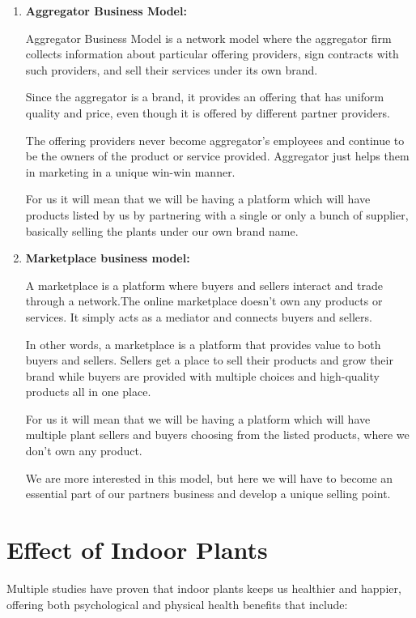 \documentclass{article}
\begin{document}
\begin{enumerate}

\item  \textbf{Aggregator Business Model:}

Aggregator Business Model is a network model where the aggregator firm collects information about particular offering providers, sign contracts with such providers, and sell their services under its own brand.

Since the aggregator is a brand, it provides an offering that has uniform quality and price, even though it is offered by different partner providers.

The offering providers never become aggregator’s employees and continue to be the owners of the product or service provided. Aggregator just helps them in marketing in a unique win-win manner.

For us it will mean that we will be having a platform which will have products listed by us by partnering with a single or only a bunch of supplier, basically selling the plants under our own brand name.


\item  \textbf{Marketplace business model:}

A marketplace is a platform where buyers and sellers interact and trade through a network.The online marketplace doesn’t own any products or services. It simply acts as a mediator and connects buyers and sellers.

In other words, a marketplace is a platform that provides value to both buyers and sellers. Sellers get a place to sell their products and grow their brand while buyers are provided with multiple choices and high-quality products all in one place.

For us it will mean that we will be having a platform which will have multiple plant sellers and buyers choosing from the listed products, where we don't own any product.

We are more interested in this model, but here we will have to become an essential part of our partners business and develop a unique selling point.

\end{enumerate}

\section*{Effect of Indoor Plants}
Multiple studies have proven that indoor plants keeps us healthier and happier, offering both psychological and physical health benefits that include:
\end{document}
